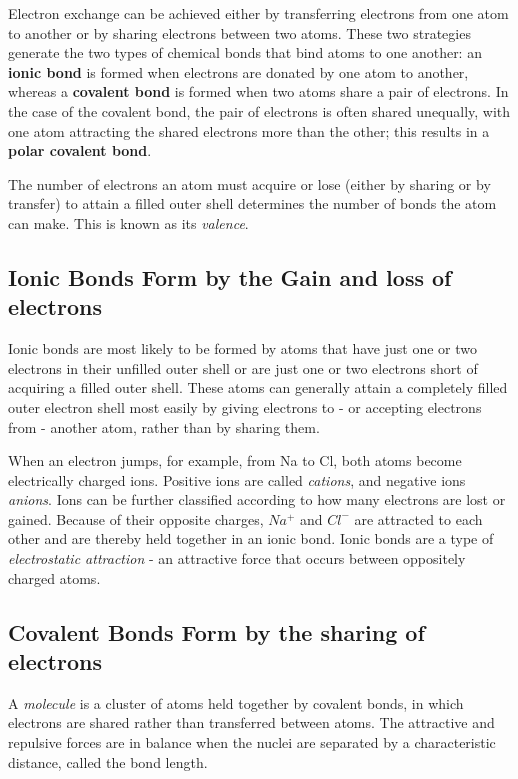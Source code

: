 Electron exchange can be achieved either by transferring electrons from one
atom to another or by sharing electrons between two atoms. These two strategies generate the two
types of chemical bonds that bind atoms to one another: an \textbf{ionic bond}
is formed when electrons are donated by one atom to another, whereas a
\textbf{covalent bond} is formed when two atoms share a pair of electrons.
In the case of the covalent bond, the pair of electrons is often shared
unequally, with one atom attracting the shared electrons more than the
other; this results in a \textbf{polar covalent bond}.

The number of electrons an atom must acquire or lose (either by sharing or
by transfer) to attain a filled outer shell determines the number of bonds
the atom can make. This is known as its \textit{valence}.

\subsection{Ionic Bonds Form by the Gain and loss of electrons}

Ionic bonds are most likely to be formed by atoms that have just one or
two electrons in their unfilled outer shell or are just one or two electrons
short of acquiring a filled outer shell. These atoms can generally attain
a completely filled outer electron shell most easily by giving electrons
to - or accepting electrons from - another atom, rather than by sharing
them.

When an electron jumps, for example, from Na to Cl, both atoms become
electrically charged ions.
Positive ions are called \textit{cations}, and negative ions \textit{anions}. Ions can be
further classified according to how many electrons are lost or gained.
Because of their opposite charges, $Na^{+}$ and $Cl^{-}$ are attracted to each other
and are thereby held together in an ionic bond.
Ionic bonds are a type of \textit{electrostatic attraction} - an attractive force
that occurs between oppositely charged atoms.

\subsection{Covalent Bonds Form by the sharing of electrons}

A \textit{molecule} is a cluster of atoms held together by covalent bonds, in which
electrons are shared rather than transferred between atoms.
The attractive and repulsive forces are in balance when the nuclei are separated
by a characteristic distance, called the bond length.

